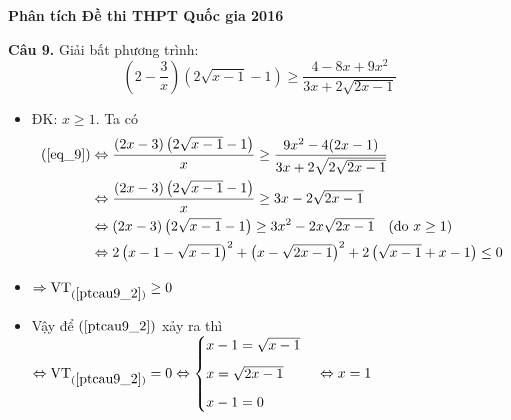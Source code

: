 \documentclass[11pt]{beamer} %
\newcommand\Fontvi{\fontsize{9}{7.2}\selectfont}
\newcommand{\cau}[2]{\begin{block}{}
		{\color{red}\textbf{Câu #1.}} #2
	\end{block}
}
\begin{document}
\begin{frame}{\textbf{\qquad Phân tích Đề thi THPT Quốc gia 2016}}
	\Fontvi
	\cau{9}{Giải bất phương trình: \begin{equation}\label{eq_9}
			\left(2-\dfrac{3}{x}\right)\left(2\sqrt{x-1}-1\right) \geq \dfrac{4-8x+9x^2}{3x+2\sqrt{2x-1}}
		\end{equation}}\pause
	\begin{itemize}
		\item<+-|alert@+>  ĐK: $x\geq 1$. Ta có
		\begin{align}
			(\ref{eq_9})&\Leftrightarrow \frac{(2x-3)\left(2\sqrt{x-1}-1\right)}{x}\geq \frac{9x^2-4(2x-1)}{3x+2\sqrt{2\sqrt{2x-1}}}\nonumber\\
			&\Leftrightarrow \frac{(2x-3)\left(2\sqrt{x-1}-1\right)}{x}\geq 3x-2\sqrt{2x-1}\nonumber\\
			&\Leftrightarrow (2x-3)\left(2\sqrt{x-1}-1\right)\geq 3x^2-2x\sqrt{2x-1} \quad(\mbox{do }x\geq 1)\nonumber\\
			&\Leftrightarrow 2\left(x-1-\sqrt{x-1}\right)^2+\left(x-\sqrt{2x-1}\right)^2+2\left(\sqrt{x-1}+x-1\right)\leq 0\label{ptcau9_2}
		\end{align}
		\item<+-|alert@+> $\Rightarrow \mbox{VT}_{(\ref{ptcau9_2})}\geq 0$
		\item<+-|alert@+> Vậy để $(\ref{ptcau9_2})$ xảy ra thì $\Leftrightarrow \mbox{VT}_{(\ref{ptcau9_2})}=0\Leftrightarrow
		\begin{cases}
		x-1=\sqrt{x-1}\\[6pt]
		x=\sqrt{2x-1}\\[6pt]
		x-1=0
		\end{cases}\Leftrightarrow x=1$
	\end{itemize}
\end{frame}
\end{document}
